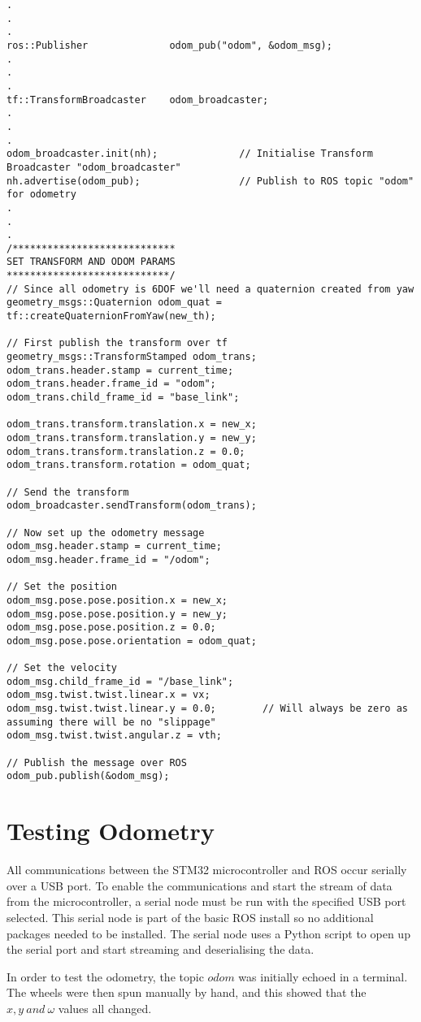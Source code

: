 \begin{verbatim}
.
.
.
ros::Publisher              odom_pub("odom", &odom_msg);
.
.
.
tf::TransformBroadcaster    odom_broadcaster;
.
.
.
odom_broadcaster.init(nh);              // Initialise Transform Broadcaster "odom_broadcaster"
nh.advertise(odom_pub);                 // Publish to ROS topic "odom" for odometry
.
.
.
/****************************
SET TRANSFORM AND ODOM PARAMS
****************************/
// Since all odometry is 6DOF we'll need a quaternion created from yaw
geometry_msgs::Quaternion odom_quat = tf::createQuaternionFromYaw(new_th);

// First publish the transform over tf
geometry_msgs::TransformStamped odom_trans;
odom_trans.header.stamp = current_time;
odom_trans.header.frame_id = "odom";
odom_trans.child_frame_id = "base_link";

odom_trans.transform.translation.x = new_x;
odom_trans.transform.translation.y = new_y;
odom_trans.transform.translation.z = 0.0;
odom_trans.transform.rotation = odom_quat;

// Send the transform
odom_broadcaster.sendTransform(odom_trans);

// Now set up the odometry message
odom_msg.header.stamp = current_time;
odom_msg.header.frame_id = "/odom";

// Set the position
odom_msg.pose.pose.position.x = new_x;
odom_msg.pose.pose.position.y = new_y;
odom_msg.pose.pose.position.z = 0.0;
odom_msg.pose.pose.orientation = odom_quat;

// Set the velocity
odom_msg.child_frame_id = "/base_link";
odom_msg.twist.twist.linear.x = vx;
odom_msg.twist.twist.linear.y = 0.0;        // Will always be zero as assuming there will be no "slippage"
odom_msg.twist.twist.angular.z = vth;

// Publish the message over ROS
odom_pub.publish(&odom_msg);     
\end{verbatim}

\section{Testing Odometry}

All communications between the STM32 microcontroller and ROS occur serially over a USB port. To enable the communications and start the stream of data from the microcontroller, a serial node must be run with the specified USB port selected. This serial node is part of the basic ROS install so no additional packages needed to be installed. The serial node uses a Python script to open up the serial port and start streaming and deserialising the data.

In order to test the odometry, the topic $odom$ was initially echoed in a terminal. The wheels were then spun manually by hand, and this showed that the $x,y \ and \ \omega$ values all changed.